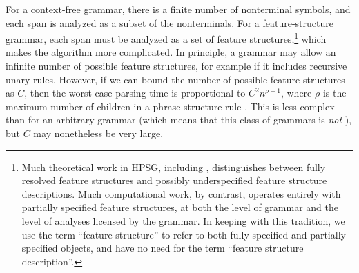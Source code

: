 \documentclass[output=paper,nonflat]{langsci/langscibook}
\begin{document}
For a context-free grammar, there is a finite number of nonterminal symbols,
and each span is analyzed as a subset of the nonterminals.
For a feature-structure grammar, each span must be analyzed as a set of feature structures,\footnote{%
	Much theoretical work in HPSG, including \citet{ps2},
	distinguishes between fully resolved feature structures and possibly underspecified feature structure descriptions.
	Much computational work, by contrast, operates entirely with partially specified feature structures,
	at both the level of grammar and the level of analyses licensed by the grammar.
	In keeping with this tradition, we use the term
	``feature structure'' to refer to both fully specified and partially specified objects,
	and have no need for the term ``feature structure description''.
}
which makes the algorithm more complicated.
In principle, a grammar may allow an infinite number of possible feature structures,
for example if it includes recursive unary rules.
However, if we can bound the number of possible feature structures as $C$,
then the worst-case parsing time is proportional to $C^2 n^{\rho+1}$,
where $\rho$ is the maximum number of children in a phrase-structure rule
\citep[Section~3.2.3]{carroll1993parse}. 
This is less complex than for an arbitrary grammar
(which means that this class of grammars is \emph{not} ),
but $C$ may nonetheless be very large.

\end{document}
